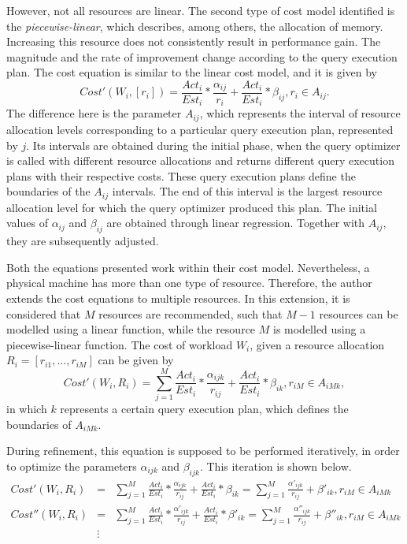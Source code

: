 However, not all resources are linear. The second type of cost model identified is the \textit{piecewise-linear}, which describes, among others, the allocation of memory. Increasing this resource does not consistently result in performance gain. The magnitude and the rate of improvement change according to the query execution plan. The cost equation is similar to the linear cost model, and it is given by
\[
  Cost'(W_{i}, [r_{i}]) = \frac{Act_{i}}{Est_{i}} * \frac{\alpha_{ij}}{r_{i}} + \frac{Act_{i}}{Est_{i}} * \beta_{ij}, r_{i} \in A_{ij}.
\]
The difference here is the parameter $A_{ij}$, which represents the interval of resource allocation levels corresponding to a particular query execution plan, represented by $j$. Its intervals are obtained during the initial phase, when the query optimizer is called with different resource allocations and returns different query execution plans with their respective costs. These query execution plans define the boundaries of the $A_{ij}$ intervals. The end of this interval is the largest resource allocation level for which the query optimizer produced this plan. The initial values of $\alpha_{ij}$ and $\beta_{ij}$ are obtained through linear regression. Together with $A_{ij}$, they are subsequently adjusted.

Both the equations presented work within their cost model. Nevertheless, a physical  machine has more than one type of resource. Therefore, the author extends the cost equations to multiple resources. In this extension, it is considered that $M$ resources are recommended, such that $M-1$ resources can be modelled using a linear function, while the resource $M$ is modelled using a piecewise-linear function. The cost of workload $W_{i}$, given a resource allocation $R_{i} = [r_{i1},...,r_{iM}]$ can be given by
\[
  Cost'(W_{i}, R_{i}) = \sum_{j=1}^{M} \frac{Act_{i}}{Est_{i}} * \frac{\alpha_{ijk}}{r_{ij}} + \frac{Act_{i}}{Est_{i}} * \beta_{ik}, r_{iM} \in A_{iMk},
\]
in which $k$ represents a certain query execution plan, which defines the boundaries of $A_{iMk}$. 

During refinement, this equation is supposed to be performed iteratively, in order to optimize the parameters $\alpha_{ijk}$ and $\beta_{ijk}$. This iteration is shown below.
\begin{eqnarray*}
 Cost'(W_{i}, R_{i}) &=& \sum_{j=1}^{M} \frac{Act_{i}}{Est_{i}} * \frac{\alpha_{ijk}}{r_{ij}} + \frac{Act_{i}}{Est_{i}} * \beta_{ik} = \sum_{j=1}^{M} \frac{\alpha'_{ijk}}{r_{ij}} + \beta'_{ik}, r_{iM} \in A_{iMk} \\
 Cost''(W_{i}, R_{i}) &=& \sum_{j=1}^{M} \frac{Act_{i}}{Est_{i}} * \frac{\alpha'_{ijk}}{r_{ij}} + \frac{Act_{i}}{Est_{i}} * \beta'_{ik} = \sum_{j=1}^{M} \frac{\alpha''_{ijk}}{r_{ij}} + \beta''_{ik}, r_{iM} \in A_{iMk} \\
  &\vdots&
\end{eqnarray*}

